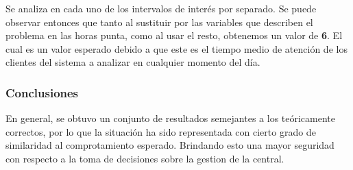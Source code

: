 \documentclass{article}
\begin{document}
			Se analiza en cada uno de los intervalos de interés por separado. Se puede observar entonces que tanto al sustituir por las variables que describen el problema en las horas punta, como al usar el resto, obtenemos un valor de \textbf{6}. El cual es un valor esperado debido a que este es el tiempo medio de atención de los clientes
			del sistema a analizar en cualquier momento del día.
			
			\subsubsection*{Conclusiones}
			En general, se obtuvo un conjunto de resultados semejantes a los teóricamente correctos, por lo que la situación ha sido representada con cierto grado de similaridad al comprotamiento esperado. Brindando esto una mayor seguridad con respecto a la toma de decisiones
			sobre la gestion de la central.
			
			
			
			
			
			
			
		
\end{document}
